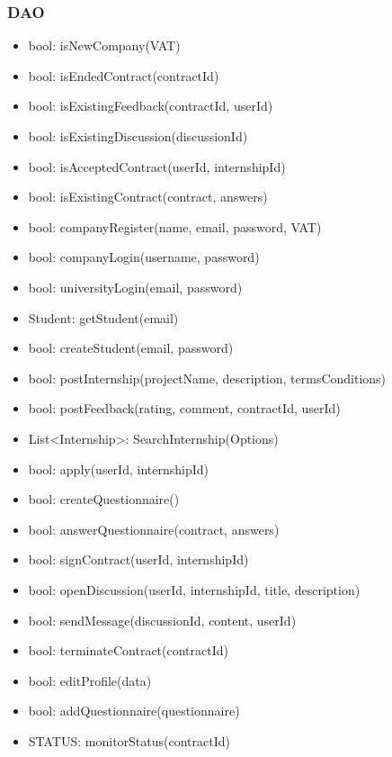 \subsubsection{DAO}
\begin{itemize}
    \item bool: isNewCompany(VAT)
    \item bool: isEndedContract(contractId)
    \item bool: isExistingFeedback(contractId, userId)
    \item bool: isExistingDiscussion(discussionId)
    \item bool: isAcceptedContract(userId, internshipId)
    \item bool: isExistingContract(contract, answers)
    \item bool: companyRegister(name, email, password, VAT)
    \item bool: companyLogin(username, password)
    \item bool: universityLogin(email, password)
    \item Student: getStudent(email)
    \item bool: createStudent(email, password)
    \item bool: postInternship(projectName, description, termsConditions)
    \item bool: postFeedback(rating, comment, contractId, userId)
    \item List<Internship>: SearchInternship(Options)
    \item bool: apply(userId, internshipId)
    \item bool: createQuestionnaire()
    \item bool: answerQuestionnaire(contract, answers)
    \item bool: signContract(userId, internshipId)
    \item bool: openDiscussion(userId, internshipId, title, description)
    \item bool: sendMessage(discussionId, content, userId)
    \item bool: terminateContract(contractId)
    \item bool: editProfile(data)
    \item bool: addQuestionnaire(questionnaire)
    \item STATUS: monitorStatus(contractId)
\end{itemize}
